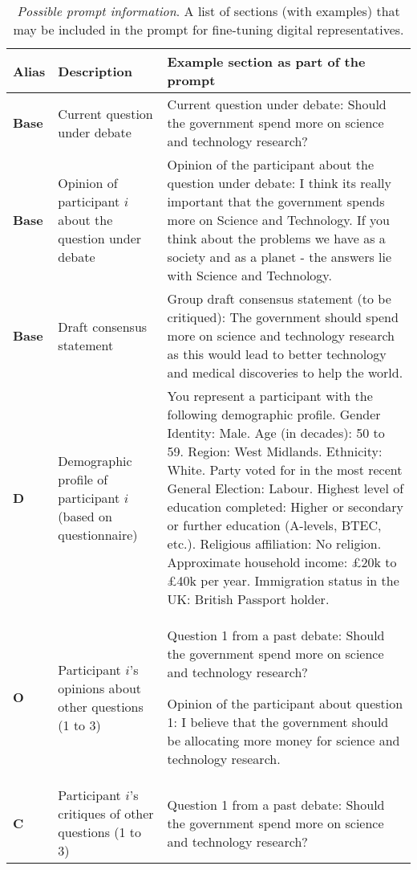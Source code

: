 \vspace{-0.75em}
\begin{table}[H]\small
{}
\caption{\textit{Possible prompt information}. A list of sections (with examples) that may be included in the prompt for fine-tuning digital representatives.}
\label{tab:prompt-info}
\begin{center}
\begin{adjustbox}{max width=1.005\textwidth}
\begin{tabular}{A|B|C}
\toprule
\textbf{Alias}
&
\textbf{Description}
&
\textbf{Example section as part of the prompt}
\\
\toprule
\textbf{Base}
&
Current question under debate
&
Current question under debate: Should the government spend more on science and technology research?
\\
\midrule
\textbf{Base}
&
Opinion of participant $i$ about the question under debate
&
Opinion of the participant about the question under debate: I think its really important that the government spends more on Science and Technology. If you think about the problems we have as a society and as a planet - the answers lie with Science and Technology.
\\
\midrule
\textbf{Base}
&
Draft consensus statement
&
Group draft consensus statement (to be critiqued): The government should spend more on science and technology research as this would lead to better technology and medical discoveries to help the world.
\\
\midrule
\textbf{D}
&
Demographic profile of participant $i$ (based on questionnaire)
&
You represent a participant with the following demographic profile. Gender Identity: Male. Age (in decades): 50 to 59. Region: West Midlands. Ethnicity: White. Party voted for in the most recent General Election: Labour. Highest level of education completed: Higher or secondary or further education (A-levels, BTEC, etc.). Religious affiliation: No religion. Approximate household income: £20k to £40k per year. Immigration status in the UK: British Passport holder.
\\
\midrule
\textbf{O}
&
Participant $i$’s opinions about other questions (1 to 3)
&
Question 1 from a past debate: Should the government spend more on science and technology research?

Opinion of the participant about question 1: I believe that the government should be allocating more money for science and technology research.
\\
\midrule
\textbf{C}
&
Participant $i$’s critiques of other questions (1 to 3)
&
Question 1 from a past debate: Should the government spend more on science and technology research?


\end{tabular}
\end{adjustbox}
\end{center}
\end{table}
